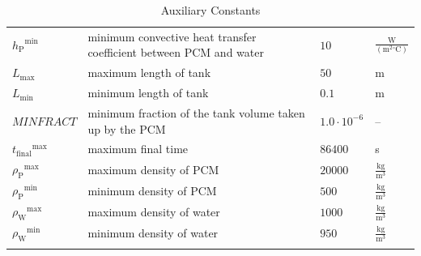 \documentclass[12pt]{article}
\begin{document}
\begin{longtabu}{l X[l] l l}
\\
${{h_{\text{P}}}^{\text{min}}}$ & minimum convective heat transfer coefficient between PCM and water & $10$ & $\frac{\text{W}}{(\text{m}^{2}{}^{\circ}\text{C})}$
\\
${L_{\text{max}}}$ & maximum length of tank & $50$ & m
\\
${L_{\text{min}}}$ & minimum length of tank & $0.1$ & m
\\
$MINFRACT$ & minimum fraction of the tank volume taken up by the PCM & $1.0\cdot{}10^{-6}$ & --
\\
${{t_{\text{final}}}^{\text{max}}}$ & maximum final time & $86400$ & s
\\
${{ρ_{\text{P}}}^{\text{max}}}$ & maximum density of PCM & $20000$ & $\frac{\text{kg}}{\text{m}^{3}}$
\\
${{ρ_{\text{P}}}^{\text{min}}}$ & minimum density of PCM & $500$ & $\frac{\text{kg}}{\text{m}^{3}}$
\\
${{ρ_{\text{W}}}^{\text{max}}}$ & maximum density of water & $1000$ & $\frac{\text{kg}}{\text{m}^{3}}$
\\
${{ρ_{\text{W}}}^{\text{min}}}$ & minimum density of water & $950$ & $\frac{\text{kg}}{\text{m}^{3}}$
\\
\bottomrule
\caption{Auxiliary Constants}
\label{Table:TAuxConsts}
\end{longtabu}
\end{document}
